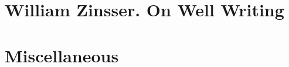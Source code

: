 \documentclass{article}
\begin{document}

\section{{\sc William Zinsser}. On Well Writing}






\section{Miscellaneous}


\printbibliography[heading=bibintoc]
	
\end{document}
